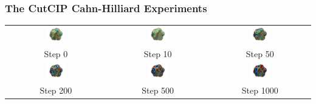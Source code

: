 \begin{frame}
\frametitle{The CutCIP Cahn-Hilliard Experiments}
\begin{center}
    \begin{tabular}{ccc}
        \includegraphics[width=0.2\textwidth]{CH-example/popcorn_0.png} &
        \includegraphics[width=0.2\textwidth]{CH-example/popcorn_10.png} &
        \includegraphics[width=0.2\textwidth]{CH-example/popcorn_50.png} \\
        Step 0 & Step 10 & Step 50 \\
        \includegraphics[width=0.2\textwidth]{CH-example/popcorn_200.png} &
        \includegraphics[width=0.2\textwidth]{CH-example/popcorn_500.png} &
        \includegraphics[width=0.2\textwidth]{CH-example/popcorn_1000.png} \\
        Step 200 & Step 500 & Step 1000 \\
    \end{tabular}
\end{center}
\end{frame}


